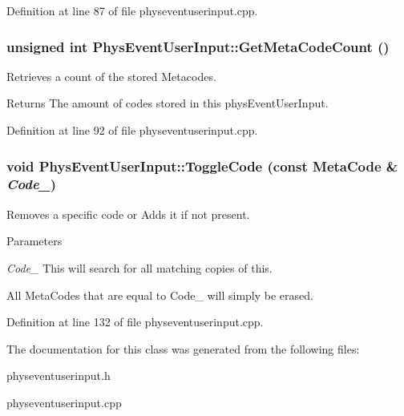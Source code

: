 Definition at line 87 of file physeventuserinput.cpp.\hypertarget{classPhysEventUserInput_a86df812a38566a572134100a422a8799}{
\subsubsection[{GetMetaCodeCount}]{\setlength{\rightskip}{0pt plus 5cm}unsigned int PhysEventUserInput::GetMetaCodeCount ()}}
\label{dc/d0e/classPhysEventUserInput_a86df812a38566a572134100a422a8799}


Retrieves a count of the stored Metacodes. \begin{DoxyReturn}{Returns}
The amount of codes stored in this physEventUserInput. 
\end{DoxyReturn}


Definition at line 92 of file physeventuserinput.cpp.\hypertarget{classPhysEventUserInput_a8325bb0172db6ea02fd06f4a5d1a7378}{
\subsubsection[{ToggleCode}]{\setlength{\rightskip}{0pt plus 5cm}void PhysEventUserInput::ToggleCode (const {\bf MetaCode} \& {\em Code\_\-})}}
\label{dc/d0e/classPhysEventUserInput_a8325bb0172db6ea02fd06f4a5d1a7378}


Removes a specific code or Adds it if not present. 
\begin{DoxyParams}{Parameters}
\item[{\em Code\_\-}]This will search for all matching copies of this.\end{DoxyParams}
All MetaCodes that are equal to Code\_\- will simply be erased. 

Definition at line 132 of file physeventuserinput.cpp.

The documentation for this class was generated from the following files:\begin{DoxyCompactItemize}
\item 
physeventuserinput.h\item 
physeventuserinput.cpp\end{DoxyCompactItemize}
